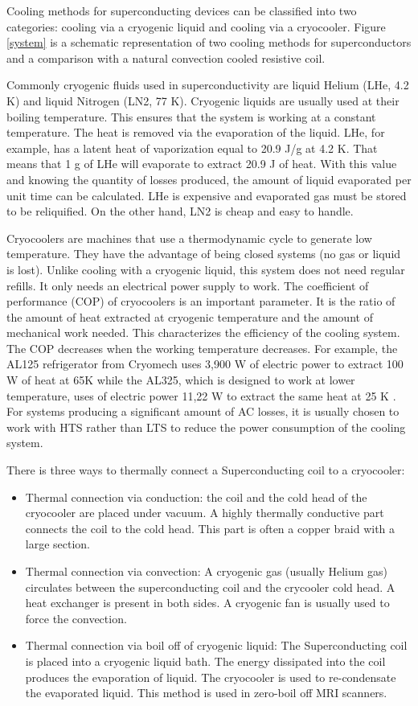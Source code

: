 \documentclass{ws-jmrr}
\begin{document}
\begin{multicols}{2}
Cooling methods for superconducting devices can be classified into two categories: cooling via a cryogenic liquid and cooling via a cryocooler. Figure \ref{system} is a schematic representation of two cooling methods for superconductors and a comparison with a natural convection cooled resistive coil.\par
Commonly cryogenic fluids used in superconductivity are liquid Helium (LHe, 4.2 K) and liquid Nitrogen (LN2, 77 K). Cryogenic liquids are usually used at their boiling temperature. This ensures that the system is working at a constant temperature. The heat is removed via the evaporation of the liquid. LHe, for example, has a latent heat of vaporization equal to 20.9 J/g at 4.2 K. That means that 1 g of LHe will evaporate to extract 20.9 J of heat. With this value and knowing the quantity of losses produced, the amount of liquid evaporated per unit time can be calculated. LHe is expensive and evaporated gas must be stored to be reliquified. On the other hand, LN2 is cheap and easy to handle.\par
Cryocoolers are machines that use a thermodynamic cycle to generate low temperature. They have the advantage of being closed systems (no gas or liquid is lost). Unlike cooling with a cryogenic liquid, this system does not need regular refills. It only needs an electrical power supply to work. The coefficient of performance (COP) of cryocoolers is an important parameter. It is the ratio of the amount of heat extracted at cryogenic temperature and the amount of mechanical work needed. This characterizes the efficiency of the cooling system. The COP decreases when the working temperature decreases. For example, the AL125 refrigerator from Cryomech uses 3,900 W of electric power to extract 100 W of heat at 65K while the AL325, which is designed to work at lower temperature, uses of electric power 11,22 W to extract the same heat at 25 K \cite{WinNT}. For systems producing a significant amount of AC losses, it is usually chosen to work with HTS rather than LTS to reduce the power consumption of the cooling system.\par
There is three ways to thermally connect a Superconducting coil to a cryocooler:
\begin{itemize}[leftmargin=*]
\item Thermal connection via conduction: the coil and the cold head of the cryocooler are placed under vacuum. A highly thermally conductive part connects the coil to the cold head. This part is often a copper braid with a large section.
\item Thermal connection via convection: A cryogenic gas (usually Helium gas) circulates between the superconducting coil and the crycooler cold head. A heat exchanger is present in both sides. A cryogenic fan is usually used to force the convection.
\item  Thermal connection via boil off of cryogenic liquid: The Superconducting coil is placed into a cryogenic liquid bath. The energy dissipated into the coil produces the evaporation of liquid. The cryocooler is used to re-condensate the evaporated liquid. This method is used in zero-boil off MRI scanners.
\end{itemize}


\end{multicols}
\end{document}
